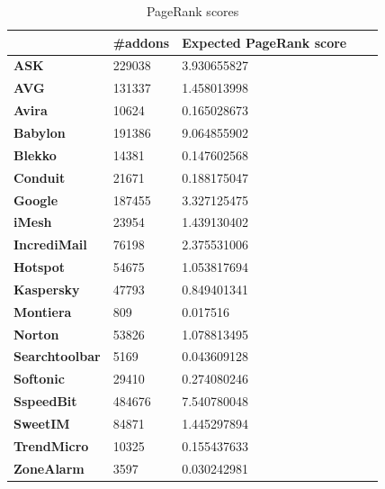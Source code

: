 \documentclass[11pt,oneside]{book}
\begin{document}
\begin{table}[t]
\centering
\caption{PageRank scores}
\label{table:pagerank_scores}
\begin{tabular}{@{}lllll@{}}
\toprule
 & \textbf{\#addons} &  \textbf{Expected PageRank score} &  \\ \midrule
\textbf{ASK} & 229038 & 3.930655827 \\
\textbf{AVG} & 131337 & 1.458013998 \\
\textbf{Avira} & 10624 & 0.165028673 \\
\textbf{Babylon} & 191386 & 9.064855902 \\
\textbf{Blekko} & 14381 & 0.147602568 \\
\textbf{Conduit} & 21671 & 0.188175047 \\
\textbf{Google} & 187455 & 3.327125475 \\
\textbf{iMesh} & 23954 & 1.439130402 \\
\textbf{IncrediMail} & 76198 & 2.375531006 \\
\textbf{Hotspot} & 54675 & 1.053817694 \\
\textbf{Kaspersky} & 47793 & 0.849401341 \\
\textbf{Montiera} & 809 & 0.017516 \\
\textbf{Norton} & 53826 & 1.078813495 \\
\textbf{Searchtoolbar} & 5169 & 0.043609128 \\
\textbf{Softonic} & 29410 & 0.274080246 \\
\textbf{SspeedBit} & 484676 & 7.540780048 \\
\textbf{SweetIM} & 84871 & 1.445297894 \\
\textbf{TrendMicro} & 10325 & 0.155437633 \\
\textbf{ZoneAlarm} & 3597 & 0.030242981 \\ \hline
\end{tabular}
\end{table}

\end{document}
